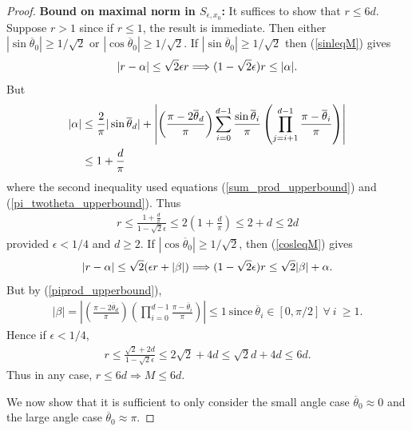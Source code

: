 \documentclass{article}
\begin{document}
\begin{proof}
\textbf{Bound on maximal norm in $S_{\epsilon,x_0}$:} It suffices to show that $r \leq 6d$. Suppose $r > 1$ since if $r \leq 1$, the result is immediate. Then either $|\sin \overline{\theta}_0| \geq 1/\sqrt{2}$ or $|\cos \overline{\theta}_0| \geq 1/\sqrt{2}$. If $|\sin \overline{\theta}_0| \geq 1/\sqrt{2}$ then (\ref{sinleqM}) gives \begin{align*}
|r - \alpha| \leq \sqrt{2}\epsilon r \Longrightarrow (1-\sqrt{2}\epsilon)r \leq |\alpha|.
\end{align*} But \begin{align*}
|\alpha| & \leq \frac{2}{\pi}|\sin \overline{\theta}_d| + \left|\left(\frac{\pi - 2\overline{\theta}_d}{\pi}\right) \sum_{i=0}^{d-1} \frac{\sin \overline{\theta}_i}{\pi}\left(\prod_{j=i+1}^{d-1} \frac{\pi - \overline{\theta}_i}{\pi}\right)\right| \\
& \leq 1 + \frac{d}{\pi}
\end{align*} where the second inequality used equations (\ref{sum_prod_upperbound}) and (\ref{pi_twotheta_upperbound}). Thus \begin{align*}
r \leq \frac{1+ \frac{d}{\pi}}{1 - \sqrt{2}\epsilon} \leq 2\left(1 + \frac{d}{\pi}\right) \leq 2 + d \leq 2d
\end{align*} provided $\epsilon < 1/4$ and $d \geq 2$. If $|\cos \overline{\theta}_0 | \geq 1/\sqrt{2}$, then (\ref{cosleqM}) gives \begin{align*}
|r - \alpha| \leq \sqrt{2}(\epsilon r + |\beta|) \Longrightarrow (1 - \sqrt{2}\epsilon)r \leq \sqrt{2}|\beta| + \alpha.
\end{align*} But by (\ref{piprod_upperbound}),  \begin{align*}
|\beta| = \left|\left(\frac{\pi - 2\overline{\theta}_d}{\pi}\right) \left(\prod_{i=0}^{d-1} \frac{\pi - \overline{\theta}_i}{\pi}\right)\right| \leq 1\ \text{since}\ \overline{\theta}_i  \in [0,\pi/2]\ \forall\ i\ \geq 1.
\end{align*} Hence if $\epsilon < 1/4$, \begin{align*}
r \leq \frac{\sqrt{2} + 2d}{1 - \sqrt{2}\epsilon} \leq 2\sqrt{2} + 4d \leq \sqrt{2}d + 4d \leq 6d.
\end{align*} Thus in any case, $r \leq 6d \Longrightarrow M \leq 6d$. 

We now show that it is sufficient to only consider the small angle case $\overline{\theta}_0 \approx 0$ and the large angle case $\overline{\theta}_0 \approx \pi$.


\end{proof}
\end{document}
